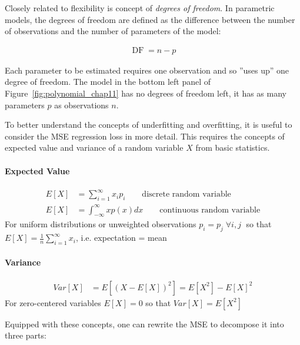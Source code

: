 Closely related to flexibility is concept of \emph{degrees of freedom}. In parametric models, the degrees of freedom are defined as the difference between the number of observations and the number of parameters of the model:

\begin{align*}
\operatorname{DF} = n - p
\end{align*}

\noindent Each parameter to be estimated requires one observation and so ''uses up'' one degree of freedom. The model in the bottom left panel of Figure~\ref{fig:polynomial_chap11} has no degrees of freedom left, it has as many parameters $p$ as observations $n$. 

To better understand the concepts of underfitting and overfitting, it is useful to consider the MSE regression loss in more detail. This requires the concepts of expected value and variance of a random variable $X$ from basic statistics.

\begin{infobox}
\paragraph*{Expected Value} 
\begin{align*}
E[X] &= \sum_{i=1}^{\infty} x_i p_i \qquad \text{discrete random variable}\\
E[X] &= \int_{-\infty}^{\infty} x p(x) dx \qquad \text{continuous random variable}
\end{align*}
For uniform distributions or unweighted observations $p_i=p_j \; \forall i, j \; $ so that $E[X] = \frac{1}{n} \sum_{i=1}^{\infty} x_i $, i.e. expectation = mean
\end{infobox}

\begin{infobox}
\paragraph*{Variance} 
\begin{align*}
Var[X] &= E[(X - E[X])^2] = E[X^2] - E[X]^2 
\end{align*}
For zero-centered variables $E[X] = 0$ so that $Var[X] = E[X^2]$
\end{infobox}

Equipped with these concepts, one can rewrite the MSE to decompose it into three parts:

